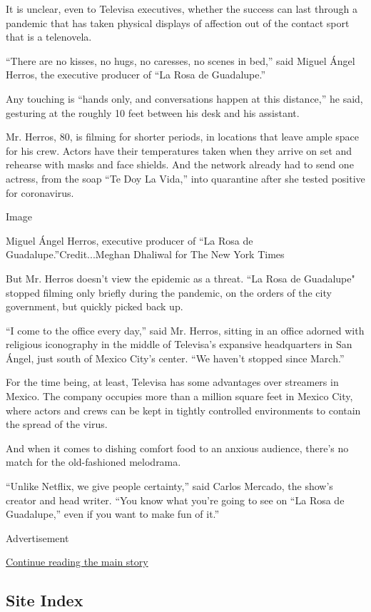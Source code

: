 It is unclear, even to Televisa executives, whether the success can last
through a pandemic that has taken physical displays of affection out of
the contact sport that is a telenovela.

``There are no kisses, no hugs, no caresses, no scenes in bed,'' said
Miguel Ángel Herros, the executive producer of ``La Rosa de Guadalupe.''

Any touching is ``hands only, and conversations happen at this
distance,'' he said, gesturing at the roughly 10 feet between his desk
and his assistant.

Mr. Herros, 80, is filming for shorter periods, in locations that leave
ample space for his crew. Actors have their temperatures taken when they
arrive on set and rehearse with masks and face shields. And the network
already had to send one actress, from the soap ``Te Doy La Vida,'' into
quarantine after she tested positive for coronavirus.

Image

Miguel Ángel Herros, executive producer of ``La Rosa de
Guadalupe.''Credit...Meghan Dhaliwal for The New York Times

But Mr. Herros doesn't view the epidemic as a threat. ``La Rosa de
Guadalupe" stopped filming only briefly during the pandemic, on the
orders of the city government, but quickly picked back up.

``I come to the office every day,'' said Mr. Herros, sitting in an
office adorned with religious iconography in the middle of Televisa's
expansive headquarters in San Ángel, just south of Mexico City's center.
``We haven't stopped since March.''

For the time being, at least, Televisa has some advantages over
streamers in Mexico. The company occupies more than a million square
feet in Mexico City, where actors and crews can be kept in tightly
controlled environments to contain the spread of the virus.

And when it comes to dishing comfort food to an anxious audience,
there's no match for the old-fashioned melodrama.

``Unlike Netflix, we give people certainty,'' said Carlos Mercado, the
show's creator and head writer. ``You know what you're going to see on
``La Rosa de Guadalupe,'' even if you want to make fun of it.''

Advertisement

\protect\hyperlink{after-bottom}{Continue reading the main story}

\hypertarget{site-index}{%
\subsection{Site Index}\label{site-index}}

